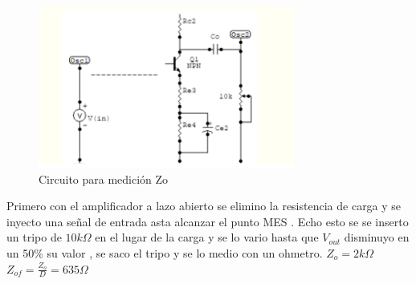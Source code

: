 \documentclass[12pt, letterpaper]{article}
\begin{document}
\singlespacing
\begin{figure}[H]
	\centering
	\includegraphics[width=0.75\textwidth]{Imagenes/zo.png}

	\caption{Circuito para medición Zo}
	\label{fig:med_Zo}
\end{figure}
Primero con el amplificador a lazo abierto se elimino la resistencia de carga y se inyecto una señal de entrada asta alcanzar el punto MES . Echo esto se se inserto un tripo de $10k\Omega$ en el lugar de la carga y se lo vario hasta que $V_{out}$ disminuyo en un 50\% su valor , se saco el tripo y se lo medio con un ohmetro.
\singlespacing
$Z_o=2k\Omega$
$Z_{of}=\frac{Z_o}{D}=635\Omega$
\singlespacing
\end{document}
